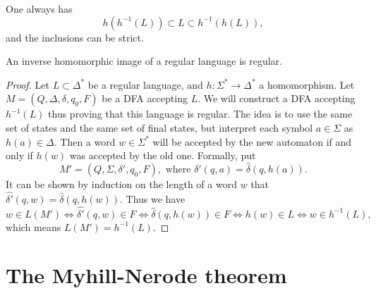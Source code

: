 \begin{page}
\setcounter{section}{3}
\setcounter{subsection}{4}
\setcounter{dfn}{16}
\label{portion:1037}


One always has
\[
h(h^{-1}(L)) \subset L \subset h^{-1}(h(L)),
\]
and the inclusions can be strict.


\end{page}

\begin{page}
\setcounter{section}{3}
\setcounter{subsection}{4}
\setcounter{dfn}{17}
\label{portion:1039}

\begin{thm}
An inverse homomorphic image of a regular language is regular.
\end{thm}

\end{page}

\begin{page}
\setcounter{section}{4}
\setcounter{subsection}{0}
\setcounter{dfn}{17}
\label{portion:1040}

\begin{proof}
Let $L \subset \Delta^*$ be a regular language, and $h \colon \Sigma^* \to \Delta^*$ a homomorphism.
Let $M = (Q, \Delta, \delta, q_0, F)$ be a DFA accepting $L$.
We will construct a DFA accepting $h^{-1}(L)$ thus proving that this language is regular.
The idea is to use the same set of states and the same set of final states, but interpret each symbol $a \in \Sigma$ as $h(a) \in \Delta$.
Then a word $w \in \Sigma^*$ will be accepted by the new automaton if and only if $h(w)$ was accepted by the old one.
Formally, put
\[
M' = (Q, \Sigma, \delta', q_0, F), \text{ where }\delta'(q, a) = \widehat{\delta}(q, h(a)).
\]
It can be shown by induction on the length of a word $w$ that $\widehat{\delta'}(q, w) = \widehat{\delta}(q, h(w))$.
Thus we have
\[
w \in L(M') \Leftrightarrow \widehat{\delta'}(q, w) \in F \Leftrightarrow \widehat{\delta}(q, h(w)) \in F \Leftrightarrow h(w) \in L
\Leftrightarrow w \in h^{-1}(L),
\]
which means $L(M') = h^{-1}(L)$.
\end{proof}






\end{page}

\begin{page}
\setcounter{section}{4}
\setcounter{subsection}{1}
\setcounter{dfn}{0}
\label{portion:1041}

\section{The Myhill-Nerode theorem}

\end{page}


